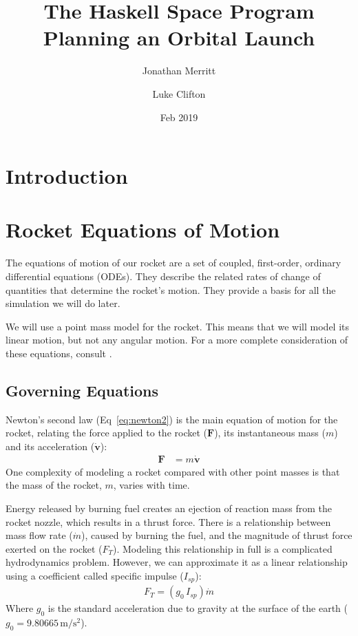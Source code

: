 \documentclass[12pt,openany]{book}
\title{
  The Haskell Space Program\\
  Planning an Orbital Launch
}
\author{
  Jonathan Merritt
  \and
  Luke Clifton
}
\date{Feb 2019}
\renewcommand{\vec}[1]{\ensuremath{\mathbf{#1}}}
\newcommand{\vecdot}[1]{\ensuremath{\dot{\mathbf{#1}}}}
\begin{document}
\maketitle
\tableofcontents

\chapter{Introduction}

\chapter{Rocket Equations of Motion}
\label{ch:rocket-eom}

The equations of motion of our rocket are a set of coupled, first-order, ordinary differential equations (ODEs). They describe the related rates of change of quantities that determine the rocket's motion. They provide a basis for all the simulation we will do later.

We will use a point mass model for the rocket. This means that we will model its linear motion, but not any angular motion. For a more complete consideration of these equations, consult \cite{gantmacher1950}.

\section{Governing Equations}

Newton's second law (Eq~\ref{eq:newton2}) is the main equation of motion for the rocket, relating the force applied to the rocket ($\vec{F}$), its instantaneous mass ($m$) and its acceleration ($\vecdot{v}$):
\begin{align}
  \vec{F} &= m \vecdot{v}  \label{eq:newton2}
\end{align}
One complexity of modeling a rocket compared with other point masses is that the mass of the rocket, $m$, varies with time.

Energy released by burning fuel creates an ejection of reaction mass from the rocket nozzle, which results in a thrust force. There is a relationship between mass flow rate ($\dot{m}$), caused by burning the fuel, and the magnitude of thrust force exerted on the rocket ($F_T$). Modeling this relationship in full is a complicated hydrodynamics problem. However, we can approximate it as a linear relationship using a coefficient called specific impulse ($I_{sp}$):
\begin{align}
  F_T = \left(g_0\,I_{sp}\right)\dot{m}
\end{align}
Where $g_0$ is the standard acceleration due to gravity at the surface of the earth ($g_0 = 9.80665\,\mathrm{m}/\mathrm{s}^2$).
\end{document}

